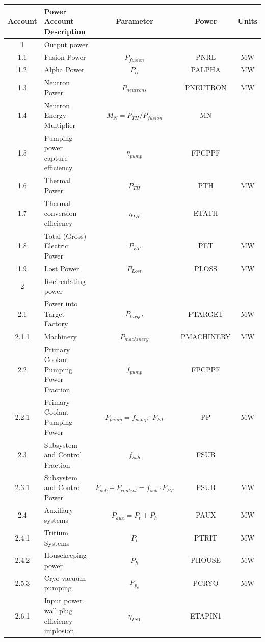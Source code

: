\begin{table}[ht!]								
\centering								
\begin{tabular}{|c|p{5cm}|c|c|c|}								
\hline								
\textbf{Account}	&	\textbf{Power Account Description}	&	\textbf{Parameter }	&	\textbf{Power}	&	\textbf{Units} \\
\hline								
1	&	Output power	&		&		&	\\
\hline
1.1	&	Fusion Power	&	$P_{{fusion}}$	&	PNRL	&	MW \\
1.2	&	Alpha Power	&	$P_{{\alpha}}$	&	PALPHA	&	MW \\
1.3	&	Neutron Power	&	$P_{{neutrons}}$	&	PNEUTRON	&	MW \\
1.4	&	Neutron Energy Multiplier	&	$M_N = P_{{TH}}/P_{{fusion}}$	&	MN	&	\\
1.5	&	Pumping power capture efficiency	&	$\eta_{{pump}}$	&	FPCPPF	&	\\
1.6	&	Thermal Power	&	$P_{{TH}}$	&	PTH	&	MW \\
1.7	&	Thermal conversion efficiency	&	$\eta_{{TH}}$	&	ETATH	&	\\
1.8	&	Total (Gross) Electric Power	&	$P_{{ET}}$	&	PET	&	MW \\
1.9	&	Lost Power	&	$P_{{Lost}}$	&	PLOSS	&	MW \\
\hline								
2	&	Recirculating power	&		&		&	\\
\hline
2.1	&	Power into Target Factory 	&	$P_{target}$ &	PTARGET	&	MW \\
2.1.1	&	Machinery	&	$P_{machinery}$	&	PMACHINERY	&	MW \\
2.2	&	Primary Coolant Pumping Power Fraction	&	$f_{{pump}}$	&	FPCPPF &	\\
2.2.1	&	Primary Coolant Pumping Power	&	$P_{{pump}} = f_{{pump}} \cdot P_{{ET}}$	&	PP	&	MW \\
2.3	&	Subsystem and Control Fraction	&	$f_{{sub}}$	&	FSUB	&	\\
2.3.1	&	Subsystem and Control Power	&	$P_{{sub}} + P_{{control}} = f_{{sub}} \cdot P_{{ET}}$	&	PSUB	&	MW \\
2.4	&	Auxiliary systems	&	$P_{{aux}} = P_{{t}} + P_{{h}}$	&	PAUX	&	MW \\
2.4.1	&	Tritium Systems	&	$P_{{t}}$	&	PTRIT	&	MW \\
2.4.2	&	Housekeeping power	&	$P_{{h}}$	&	PHOUSE	&	MW \\
2.5.3	&	Cryo vacuum pumping	&	$P_{{p}_c}$	&	PCRYO	&	MW \\
2.6.1	& Input power wall plug efficiency implosion &	$\eta_{IN1}$ & ETAPIN1	&	\\

\end{tabular}
\end{table}
